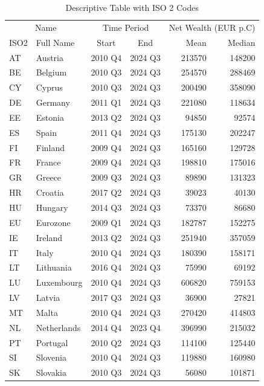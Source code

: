 \documentclass[
  a4paper,
  DIV=11,
  numbers=noendperiod]{scrartcl}
\begin{document}
\begin{table}[h]

\caption{\label{tbl-descriptive}Descriptive Table with ISO 2 Codes}

\begin{minipage}{\linewidth}

\fontsize{10.0pt}{12.0pt}\selectfont
\begin{tabular*}{\linewidth}{@{\extracolsep{\fill}}llccrr}
\toprule
\multicolumn{2}{c}{Name} & \multicolumn{2}{c}{Time Period} & \multicolumn{2}{c}{Net Wealth (EUR p.C)} \\ 
\cmidrule(lr){1-2} \cmidrule(lr){3-4} \cmidrule(lr){5-6}
ISO2 & Full Name & Start & End & Mean & Median \\ 
\midrule\addlinespace[2.5pt]
AT & Austria & 2010 Q4 & 2024 Q3 & 213570 & 148200 \\ 
BE & Belgium & 2010 Q3 & 2024 Q3 & 254570 & 288469 \\ 
CY & Cyprus & 2010 Q3 & 2024 Q3 & 200490 & 358090 \\ 
DE & Germany & 2011 Q1 & 2024 Q3 & 221080 & 118634 \\ 
EE & Estonia & 2013 Q2 & 2024 Q3 & 94850 & 92574 \\ 
ES & Spain & 2011 Q4 & 2024 Q3 & 175130 & 202247 \\ 
FI & Finland & 2009 Q4 & 2024 Q3 & 165160 & 129728 \\ 
FR & France & 2009 Q4 & 2024 Q3 & 198810 & 175016 \\ 
GR & Greece & 2009 Q3 & 2024 Q3 & 89890 & 131323 \\ 
HR & Croatia & 2017 Q2 & 2024 Q3 & 39023 & 40130 \\ 
HU & Hungary & 2014 Q3 & 2024 Q3 & 73370 & 86680 \\ 
EU & Eurozone & 2009 Q1 & 2024 Q3 & 182787 & 152275 \\ 
IE & Ireland & 2013 Q2 & 2024 Q3 & 251940 & 357059 \\ 
IT & Italy & 2010 Q4 & 2024 Q3 & 180390 & 158171 \\ 
LT & Lithuania & 2016 Q4 & 2024 Q3 & 75990 & 69192 \\ 
LU & Luxembourg & 2010 Q4 & 2024 Q3 & 606820 & 759153 \\ 
LV & Latvia & 2017 Q3 & 2024 Q3 & 36900 & 27821 \\ 
MT & Malta & 2010 Q4 & 2024 Q3 & 270420 & 414803 \\ 
NL & Netherlands & 2014 Q4 & 2023 Q4 & 396990 & 215032 \\ 
PT & Portugal & 2010 Q2 & 2024 Q3 & 114100 & 125440 \\ 
SI & Slovenia & 2010 Q4 & 2024 Q3 & 119880 & 160980 \\ 
SK & Slovakia & 2010 Q3 & 2024 Q3 & 56080 & 101871 \\ 
\bottomrule
\end{tabular*}

\end{minipage}%

\end{table}%
\end{document}
